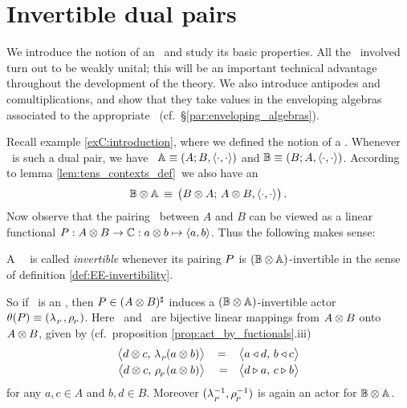 \section{Invertible dual pairs}


\begin{abs_chp}
We introduce the notion of an \idpa\ and study its basic properties.
All the \contexts\ involved turn out to be weakly unital; this will be an
important technical advantage throughout the development of the theory.
We also introduce antipodes and comultiplications, and show that they take
values in the enveloping algebras associated to the appropriate
\contexts\ (cf.\ \S \ref{par:enveloping_algebras}).
\end{abs_chp}


Recall example \ref{exC:introduction}, where we defined the notion of a \dpa\@.
Whenever \pairAB\ is such a dual pair, we have \contexts\
$\mathbb{A} \equiv (A; B, \langle\cdot, \cdot\rangle)$ and $\mathbb{B} \equiv (B; A, \langle\cdot, \cdot\rangle)$.
According to lemma \ref{lem:tens_contexts_def}\ we also have an \context
$$ \BBAA  \,\equiv\,  \left(\vertM  B \tens A; \, A \tens B, \pairing \right). $$
Now observe that the pairing \pairing\ between $A$ and $B$ can be viewed
as a linear functional $P : A \otimes B \rightarrow \mathbb{C}: a \otimes b \mapsto \langle a,b \rangle$.
Thus the following makes sense:

\begin{defn_sec}  \label{def:invertible_dpa}
A \dpa\ \pairAB\ is called {\em invertible\/} whenever its pairing $P$ is
$(\mathbb{B} \otimes \mathbb{A})$-invertible in the sense of definition \ref{def:EE-invertibility}.
\end{defn_sec}

So if \pairAB\ is an \idpa, then $P \in (A \otimes B)^\sharp$ induces a
$(\mathbb{B} \otimes \mathbb{A})$-invertible actor $\theta(P) \equiv (\lambda_{_P\!}\,,\rho_{_{\!P}})$.
Here \lp\ and \rp\ are bijective linear mappings from $A \otimes B$ onto $A \otimes B$,
given by (cf.\ proposition \ref{prop:act_by_fuctionals}.iii)
\begin{equation} \label{eq:def:lamP:rhoP}
 \begin{array}{rcl}
     \pairM{d \tens c}{\lp(a \tens b)} &=& \pairM{a \ract d}{b \ract c}
     \\
     \pairM{d \tens c}{\rp(a \tens b)} &\vertL=& \pairM{d \lact a}{c \lact b}
   \end{array}
\end{equation}
for any $a,c \in A$ and $b,d \in B$.
Moreover $(\lambda_{_P\!}^{-1},\rho_{_{\!P}}^{-1})$ is again an actor for $\mathbb{B} \otimes \mathbb{A}$.


